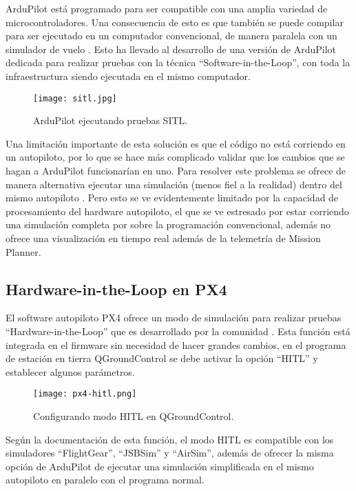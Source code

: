 ArduPilot está programado para ser compatible con una amplia variedad de microcontroladores. Una consecuencia de esto es que también se puede compilar para ser ejecutado en un computador convencional, de manera paralela con un simulador de vuelo \cite{ardupilot-sitl}. Esto ha llevado al desarrollo de una versión de ArduPilot dedicada para realizar pruebas con la técnica ``Software-in-the-Loop'', con toda la infraestructura siendo ejecutada en el mismo computador.

\begin{figure}[h]
    \centering
    \texttt{[image: sitl.jpg]}
    \caption[ArduPilot ejecutando pruebas SITL.]{ArduPilot ejecutando pruebas SITL.\footnotemark}
    \label{fig:sitl}
\end{figure}

Una limitación importante de esta solución es que el código no está corriendo en un autopiloto, por lo que se hace más complicado validar que los cambios que se hagan a ArduPilot funcionarían en uno. Para resolver este problema se ofrece de manera alternativa ejecutar una simulación (menos fiel a la realidad) dentro del mismo autopiloto \cite{sim-on-hardware}. Pero esto se ve evidentemente limitado por la capacidad de procesamiento del hardware autopiloto, el que se ve estresado por estar corriendo una simulación completa por sobre la programación convencional, además no ofrece una visualización en tiempo real además de la telemetría de Mission Planner.

\subsection{Hardware-in-the-Loop en PX4}

El software autopiloto PX4 ofrece un modo de simulación para realizar pruebas ``Hardware-in-the-Loop'' que es desarrollado por la comunidad \cite{px4-hitl}. Esta función está integrada en el firmware sin necesidad de hacer grandes cambios, en el programa de estación en tierra QGroundControl se debe activar la opción ``HITL'' y establecer algunos parámetros.

\begin{figure}[h]
    \centering
    \texttt{[image: px4-hitl.png]}
    \caption[Configurando modo HITL en QGroundControl.]{Configurando modo HITL en QGroundControl.\footnotemark}
    \label{fig:px4-hitl}
\end{figure}

Según la documentación de esta función, el modo HITL es compatible con los simuladores ``FlightGear'', ``JSBSim'' y ``AirSim'', además de ofrecer la misma opción de ArduPilot de ejecutar una simulación simplificada en el mismo autopiloto en paralelo con el programa normal.